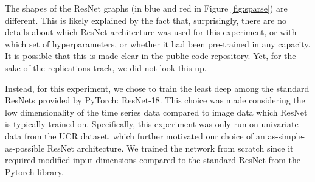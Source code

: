 
The shapes of the ResNet graphs (in blue and red in Figure \ref{fig:sparse}) are different. %
This is likely explained by
the fact that, surprisingly, there are no details about which ResNet architecture was used for this experiment, or with which set of hyperparameters, or whether it had been pre-trained in any capacity. It is possible that this is made clear in the public code repository. Yet, for the sake of the replications track, we did not look this up.

Instead, for this experiment, we chose to train the least deep among the standard ResNets provided by PyTorch: ResNet-18. This choice was made considering the low dimensionality of the time series data compared to image data which ResNet is typically trained on. Specifically, this experiment was only run on univariate data from the UCR dataset, which further motivated our choice of an as-simple-as-possible ResNet architecture. We trained the network from scratch since it required modified input dimensions compared to the standard ResNet from the Pytorch library.

